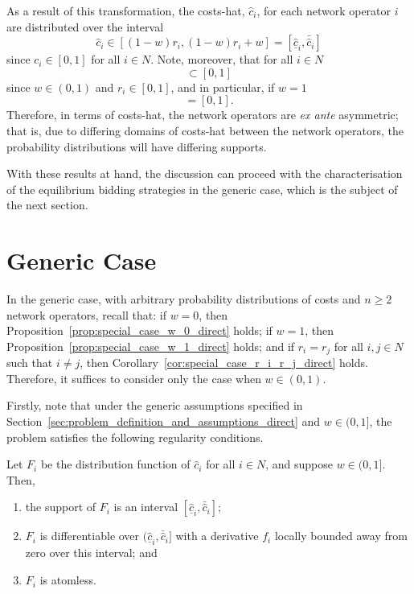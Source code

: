 As a result of this transformation, the costs-hat, $\hat{c}_i$, for each network operator $i$ are distributed over the interval
\begin{equation}
  \hat{c}_i\in [(1-w)r_i, (1-w)r_i + w]= [\underline{\hat{c}}_i, \bar{\hat{c}}_i]
\end{equation}
since $c_i\in [0,1]$ for all $i\in N$. Note, moreover, that for all $i\in N$
\begin{equation}
  [\underline{\hat{c}}_i, \bar{\hat{c}}_i] \subset [0,1]
\end{equation}
since $w\in (0,1)$ and $r_i\in [0,1]$, and in particular, if $w=1$
\begin{equation}
  [\underline{\hat{c}}_i, \bar{\hat{c}}_i] = [0,1].
\end{equation}
Therefore, in terms of costs-hat, the network operators are \emph{ex ante} asymmetric; that is, due to differing domains of costs-hat between the network operators, the probability distributions will have differing supports.

With these results at hand, the discussion can proceed with the characterisation of the equilibrium bidding strategies in the generic case, which is the subject of the next section.

\section{Generic Case} %
\label{sec:generic_case_indirect}
In the generic case, with arbitrary probability distributions of costs and $n\ge 2$ network operators, recall that: if $w=0$, then Proposition~\ref{prop:special_case_w_0_direct} holds; if $w=1$, then Proposition~\ref{prop:special_case_w_1_direct} holds; and if $r_i=r_j$ for all $i,j\in N$ such that $i\neq j$, then Corollary~\ref{cor:special_case_r_i_r_j_direct} holds. Therefore, it suffices to consider only the case when $w\in (0,1)$.

Firstly, note that under the generic assumptions specified in Section~\ref{sec:problem_definition_and_assumptions_direct} and $w\in (0,1]$, the problem satisfies the following regularity conditions.
\begin{proposition}
\label{prop:regularity_conditions_indirect}
Let $F_i$ be the distribution function of $\hat{c}_i$ for all $i\in N$, and suppose $w\in (0,1]$. Then,
\begin{enumerate}
  \item the support of $F_i$ is an interval ${[\underline{\hat{c}}_i, \bar{\hat{c}}_i]}$;
  \item $F_i$ is differentiable over ${(\underline{\hat{c}}_i, \bar{\hat{c}}_i]}$ with a derivative $f_i$ locally bounded away from zero over this interval; and
  \item $F_i$ is atomless.
\end{enumerate}
\end{proposition}

